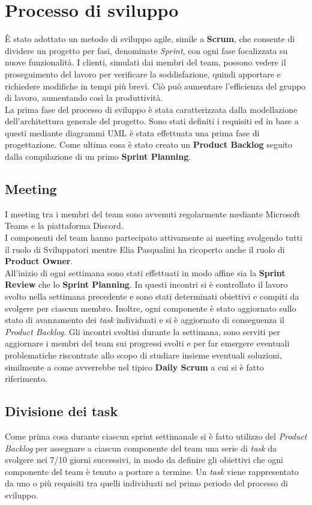 \chapter{Processo di sviluppo}

\`E stato adottato un metodo di sviluppo agile, simile a \textbf{Scrum}, che consente di dividere un progetto per fasi, denominate \textit{Sprint}, con ogni fase focalizzata su nuove funzionalit\`a. I clienti, simulati dai membri del team, possono vedere il proseguimento del lavoro per verificare la soddisfazione, quindi apportare e richiedere modifiche in tempi più brevi. Ci\`o pu\`o aumentare l'efficienza del gruppo di lavoro, aumentando cos\`i la produttivit\`a.\\
La prima fase del processo di sviluppo \`e stata caratterizzata dalla modellazione dell'architettura generale del progetto. Sono stati definiti i  requisiti ed in base a questi mediante diagrammi UML è stata effettuata una prima fase di progettazione. Come ultima cosa è stato creato  un \textbf{Product Backlog} seguito dalla compilazione di un primo \textbf{Sprint Planning}.

\section{Meeting}
I meeting tra i membri del team sono avvenuti regolarmente mediante Microsoft Teams e la piattaforma Discord.\\
I componenti del team hanno partecipato attivamente ai meeting svolgendo tutti il ruolo di Sviluppatori mentre Elia Pasqualini ha ricoperto anche il ruolo di \textbf{Product Owner}.\\
All'inizio di ogni settimana sono stati effettuati in modo affine sia la \textbf{Sprint Review} che lo \textbf{Sprint Planning}. In questi incontri si \`e controllato il lavoro svolto nella settimana precedente e sono stati determinati obiettivi e compiti da svolgere per ciascun membro. Inoltre, ogni componente \`e stato aggiornato sullo stato di avanzamento dei \textit{task} individuati e si \`e aggiornato di conseguenza il \textit{Product Backlog}. Gli incontri svoltisi durante la settimana, sono serviti per aggiornare i membri del team sui progressi svolti e per far emergere eventuali problematiche riscontrate allo scopo di studiare insieme eventuali soluzioni, similmente a come avverrebbe nel tipico \textbf{Daily Scrum} a cui si \`e fatto riferimento.

\section{Divisione dei task}
Come prima cosa durante ciascun sprint settimanale si \`e fatto utilizzo del \textit{Product Backlog} per assegnare a ciascun componente del team una serie di \textit{task} da svolgere nei 7/10 giorni successivi, in modo da definire gli obiettivi che ogni componente del team \`e tenuto a portare a termine. Un \textit{task} viene rappresentato da uno o pi\`u requisiti tra quelli individuati nel primo periodo del processo di sviluppo.

